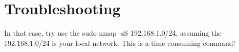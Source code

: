 \section{Troubleshooting}

\begin{description}[style=nextline]
	\item [The command \colorbox{gray!10}{arp -a} do not show my \gls{Rpi}] In that case, try use the \colorbox{gray!10}{sudo nmap -sS 192.168.1.0/24}, assuming the 192.168.1.0/24 is your local network. This is a time consuming command!
	
\end{description}



